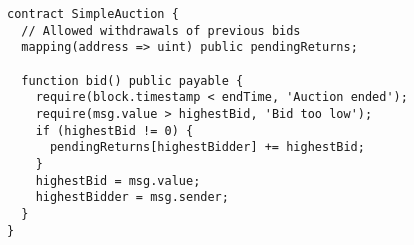 \begin{lstlisting}[language=Solidity]
contract SimpleAuction {
  // Allowed withdrawals of previous bids
  mapping(address => uint) public pendingReturns;
  
  function bid() public payable {
    require(block.timestamp < endTime, 'Auction ended');
    require(msg.value > highestBid, 'Bid too low');
    if (highestBid != 0) {
      pendingReturns[highestBidder] += highestBid;
    }
    highestBid = msg.value;
    highestBidder = msg.sender;
  }
}

\end{lstlisting}